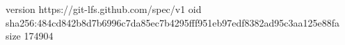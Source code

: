 version https://git-lfs.github.com/spec/v1
oid sha256:484cd842b8d7b6996c7da85ec7b4295fff951eb97edf8382ad95c3aa125e88fa
size 174904
